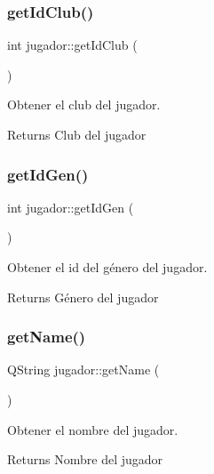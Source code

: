 \subsubsection{\texorpdfstring{get\+Id\+Club()}{getIdClub()}}
{\footnotesize\ttfamily int jugador\+::get\+Id\+Club (\begin{DoxyParamCaption}{ }\end{DoxyParamCaption})}



Obtener el club del jugador. 

\begin{DoxyReturn}{Returns}
Club del jugador 
\end{DoxyReturn}
\mbox{\label{classjugador_adb2f8c9bba1afa83be6ebf6a651769b2}} 
\subsubsection{\texorpdfstring{get\+Id\+Gen()}{getIdGen()}}
{\footnotesize\ttfamily int jugador\+::get\+Id\+Gen (\begin{DoxyParamCaption}{ }\end{DoxyParamCaption})}



Obtener el id del género del jugador. 

\begin{DoxyReturn}{Returns}
Género del jugador 
\end{DoxyReturn}
\mbox{\label{classjugador_adc3df126f15f2bb2aec01cc04145ae14}} 
\subsubsection{\texorpdfstring{get\+Name()}{getName()}}
{\footnotesize\ttfamily Q\+String jugador\+::get\+Name (\begin{DoxyParamCaption}{ }\end{DoxyParamCaption})}



Obtener el nombre del jugador. 

\begin{DoxyReturn}{Returns}
Nombre del jugador 
\end{DoxyReturn}
\mbox{\label{classjugador_ad1b16c02d5c0ec28e2a7db3ac0a09cda}} 
